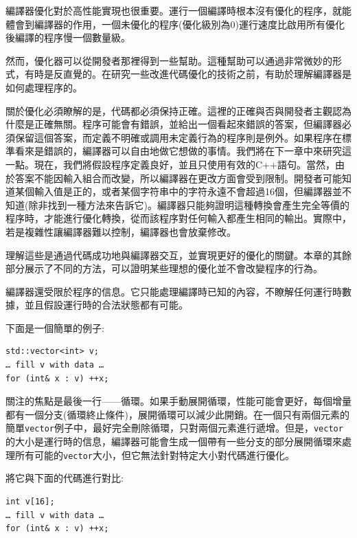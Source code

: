 
編譯器優化對於高性能實現也很重要。運行一個編譯時根本沒有優化的程序，就能體會到編譯器的作用，一個未優化的程序(優化級別為0)運行速度比啟用所有優化後編譯的程序慢一個數量級。

然而，優化器可以從開發者那裡得到一些幫助。這種幫助可以通過非常微妙的形式，有時是反直覺的。在研究一些改進代碼優化的技術之前，有助於理解編譯器是如何處理程序的。


關於優化必須瞭解的是，代碼都必須保持正確。這裡的正確與否與開發者主觀認為什麼是正確無關。程序可能會有錯誤，並給出一個看起來錯誤的答案，但編譯器必須保留這個答案，而定義不明確或調用未定義行為的程序則是例外。如果程序在標準看來是錯誤的，編譯器可以自由地做它想做的事情。我們將在下一章中來研究這一點。現在，我們將假設程序定義良好，並且只使用有效的C++語句。當然，由於答案不能因輸入組合而改變，所以編譯器在更改方面會受到限制。開發者可能知道某個輸入值是正的，或者某個字符串中的字符永遠不會超過16個，但編譯器並不知道(除非找到一種方法來告訴它)。編譯器只能夠證明這種轉換會產生完全等價的程序時，才能進行優化轉換，從而該程序對任何輸入都產生相同的輸出。實際中，若是複雜性讓編譯器難以控制，編譯器也會放棄修改。

理解這些是通過代碼成功地與編譯器交互，並實現更好的優化的關鍵。本章的其餘部分展示了不同的方法，可以證明某些理想的優化並不會改變程序的行為。

編譯器還受限於程序的信息。它只能處理編譯時已知的內容，不瞭解任何運行時數據，並且假設運行時的合法狀態都有可能。

下面是一個簡單的例子:

\begin{lstlisting}[style=styleCXX]
std::vector<int> v;
… fill v with data … 
for (int& x : v) ++x;
\end{lstlisting}

關注的焦點是最後一行——循環。如果手動展開循環，性能可能會更好，每個增量都有一個分支(循環終止條件)，展開循環可以減少此開銷。在一個只有兩個元素的簡單\texttt{vector}例子中，最好完全刪除循環，只對兩個元素進行遞增。但是，\texttt{vector}的大小是運行時的信息，編譯器可能會生成一個帶有一些分支的部分展開循環來處理所有可能的\texttt{vector}大小，但它無法針對特定大小對代碼進行優化。

將它與下面的代碼進行對比:

\begin{lstlisting}[style=styleCXX]
int v[16];
… fill v with data … 
for (int& x : v) ++x;
\end{lstlisting}

